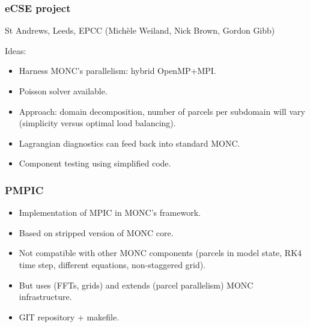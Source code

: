 \documentclass{beamer}
\def\gr#1{\color{dark_green} #1}
\def\re#1{\color{red}   #1}
\def\bl#1{\color{blue}  #1}
\def\pu#1{\color{purple} #1}
\begin{document}
\begin{frame}
\frametitle{eCSE project}

\begin{center}
St Andrews, Leeds, EPCC (Mich\`ele Weiland, Nick Brown, Gordon Gibb)
\end{center}

Ideas:
\begin{itemize}
\item Harness {\gr MONC's parallelism}: hybrid OpenMP+MPI.
\item Poisson solver available.
\item Approach: {\bl domain decomposition}, number of parcels per subdomain will vary (simplicity versus optimal load balancing).
\item {\re Lagrangian diagnostics} can feed back into standard MONC.
\item {\pu Component testing} using simplified code.
\end{itemize}

\end{frame}

\begin{frame}
\frametitle{PMPIC}
\begin{itemize}
\item Implementation of MPIC in MONC's framework.
\item Based on stripped version of MONC core.
\item Not compatible with other MONC components (parcels in model state, RK4 time step, different equations, non-staggered grid).
\item But uses (FFTs, grids) and extends (parcel parallelism) MONC infrastructure.
\item GIT repository + makefile.
\end{itemize}
\end{frame}
\end{document}
